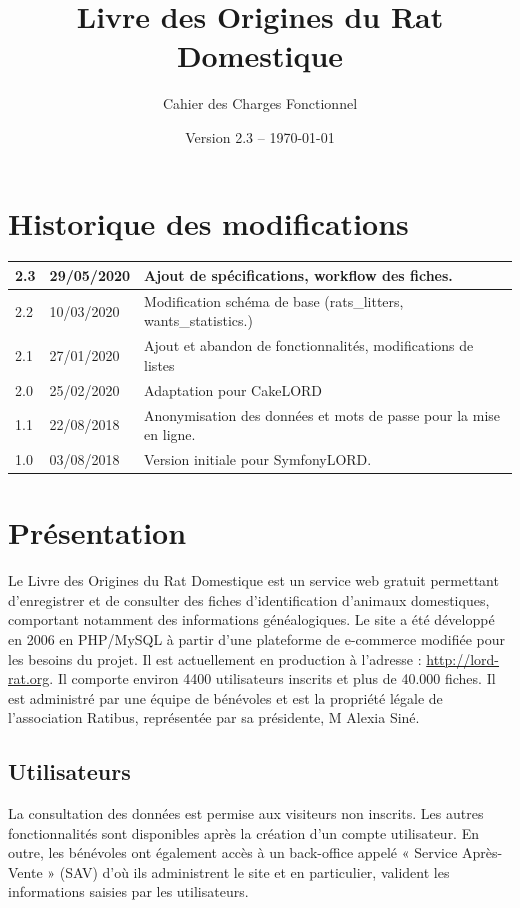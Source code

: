 ﻿\documentclass[a4paper,10pt]{article}
\title{Livre des Origines du Rat Domestique}
\author{Cahier des Charges Fonctionnel}
\date{Version 2.3 -- \today}
\begin{document}
\maketitle

\section*{Historique des modifications}

\large
\noindent\begin{tabularx}{\textwidth}{|l|l|X|}\hline
\textbf{2.3} & \textbf{29/05/2020} & Ajout de spécifications, workflow des fiches.\\\hline
2.2 & 10/03/2020 & Modification schéma de base (rats\_litters, wants\_statistics.)\\\hline
2.1 & 27/01/2020 & Ajout et abandon de fonctionnalités, modifications de listes\\\hline
2.0 & 25/02/2020 & Adaptation pour CakeLORD\\\hline
1.1 & 22/08/2018 & Anonymisation des données et mots de passe pour la mise en ligne.\\\hline
1.0 & 03/08/2018 & Version initiale pour SymfonyLORD.\\\hline
\end{tabularx}
\normalsize

\vfill

\tableofcontents

\section{Présentation}
Le Livre des Origines du Rat Domestique est un service web gratuit permettant d'enregistrer et de consulter des fiches d'identification d'animaux domestiques, comportant notamment des informations généalogiques. Le site a été développé en 2006 en PHP/MySQL à partir d'une plateforme de e-commerce modifiée pour les besoins du projet. Il est actuellement en production à l'adresse : \url{http://lord-rat.org}. Il comporte environ 4400 utilisateurs inscrits et plus de 40.000 fiches. Il est administré par une équipe de bénévoles et est la propriété légale de l'association Ratibus, représentée par sa présidente, M Alexia Siné.

\subsection{Utilisateurs}
La consultation des données est permise aux visiteurs non inscrits. Les autres fonctionnalités sont disponibles après la création d'un compte utilisateur. En outre, les bénévoles ont également accès à un back-office appelé « Service Après-Vente » (SAV) d'où ils administrent le site et en particulier, valident les informations saisies par les utilisateurs.
\end{document}
